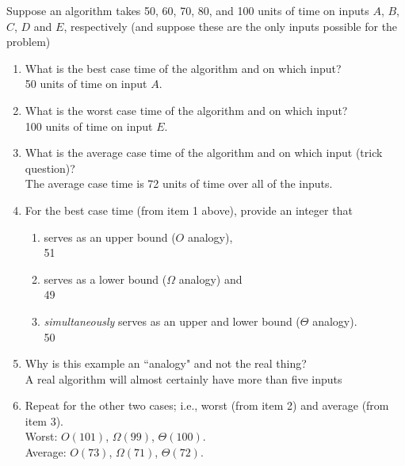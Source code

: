 \documentclass[12pt]{article}
\begin{document}
Suppose an algorithm takes 50, 60, 70, 80, and 100 units of 
time on inputs $A$, $B$, $C$, $D$ and $E$, respectively (and suppose these 
are the only inputs possible for the problem) 
\begin{enumerate}
\item What is the best case time of the algorithm and on which input? \\
50 units of time on input $A$.
\vspace*{0.1in}

\item What is the worst case time of the algorithm and on which input? \\
100 units of time on input $E$.
\vspace*{0.1in}

\item What is the average case time of the algorithm and on which input
(trick question)? \\
The average case time is 72 units of time over all of the inputs.
\vspace*{0.1in}

\item For the best case time (from item 1 above), provide an integer that 
\begin{enumerate}
\item serves as an upper bound ($O$ analogy), \\
\hspace{0.1in}51
\vspace*{0.1in}
\item serves as a lower bound ($\Omega$ analogy) and \\
\hspace{0.1in}49
\vspace*{0.1in}
\item {\em simultaneously} serves as an upper and lower bound ($\Theta$ analogy).  \\
\hspace{0.1in}50
\vspace*{0.1in}
\end{enumerate}

\item Why is this example an ``analogy" and not the real thing? \\
A real algorithm will almost certainly have more than five inputs
\vspace*{0.1in}

\item Repeat for the other two cases; i.e., worst (from item 2) and average
(from item 3). \\
Worst: $O(101)$, $\Omega (99)$, $\Theta(100)$.\\
Average: $O(73)$, $\Omega (71)$, $\Theta(72)$.
\end{enumerate}
\end{document}

